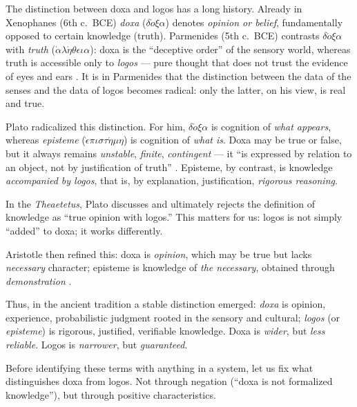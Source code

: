 \documentclass[12pt,a4paper]{article}
\begin{document}
The distinction between doxa and logos has a long history. Already in
Xenophanes (6th c.~BCE) \emph{doxa} ($\delta\acute{o}\xi\alpha$) denotes
\emph{opinion or belief}, fundamentally opposed to certain knowledge (truth).
Parmenides (5th c.~BCE) contrasts $\delta\acute{o}\xi\alpha$ with
\emph{truth} ($\grave{\alpha}\lambda\acute{\eta}\theta\epsilon\iota\alpha$):
doxa is the ``deceptive order'' of the sensory world, whereas truth is
accessible only to \emph{logos} --- pure thought that does not trust the
evidence of eyes and ears \cite{diels}. It is in Parmenides that the
distinction between the data of the senses and the data of logos becomes
radical: only the latter, on his view, is real and true.

Plato radicalized this distinction. For him, $\delta\acute{o}\xi\alpha$ is
cognition of \emph{what appears}, whereas \emph{episteme}
($\grave{\epsilon}\pi\iota\sigma\tau\acute{\eta}\mu\eta$) is cognition of
\emph{what is}. Doxa may be true or false, but it always remains
\emph{unstable}, \emph{finite}, \emph{contingent} --- it ``is expressed by
relation to an object, not by justification of truth'' \cite{plato}. Episteme,
by contrast, is knowledge \emph{accompanied by logos}, that is, by explanation,
justification, \emph{rigorous reasoning}.

In the \emph{Theaetetus}, Plato discusses and ultimately rejects the definition
of knowledge as ``true opinion with logos.'' This matters for us: logos is not
simply ``added'' to doxa; it works differently.

Aristotle then refined this: doxa is \emph{opinion}, which may be true but
lacks \emph{necessary} character; episteme is knowledge of \emph{the
necessary}, obtained through \emph{demonstration} \cite{aristotle}.

Thus, in the ancient tradition a stable distinction emerged: \emph{doxa} is
opinion, experience, probabilistic judgment rooted in the sensory and cultural;
\emph{logos} (or \emph{episteme}) is rigorous, justified, verifiable knowledge.
Doxa is \emph{wider}, but \emph{less reliable}. Logos is \emph{narrower}, but
\emph{guaranteed}.

Before identifying these terms with anything in a system, let us fix what
distinguishes doxa from logos. Not through negation (``doxa is not formalized
knowledge''), but through positive characteristics.
\end{document}
